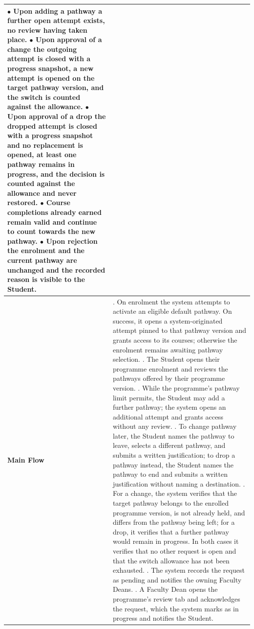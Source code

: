 \begin{longtable}{|>{\raggedright\arraybackslash}p{}|>{\raggedright\arraybackslash}p{}|}
$\bullet$ Upon adding a pathway a further open attempt exists, no review having taken place. \newline
$\bullet$ Upon approval of a change the outgoing attempt is closed with a progress snapshot, a new attempt is opened on the target pathway version, and the switch is counted against the allowance. \newline
$\bullet$ Upon approval of a drop the dropped attempt is closed with a progress snapshot and no replacement is opened, at least one pathway remains in progress, and the decision is counted against the allowance and never restored. \newline
$\bullet$ Course completions already earned remain valid and continue to count towards the new pathway. \newline
$\bullet$ Upon rejection the enrolment and the current pathway are unchanged and the recorded reason is visible to the Student. \\ \hline
\textbf{Main Flow} &
1. On enrolment the system attempts to activate an eligible default pathway. On success, it opens a system-originated attempt pinned to that pathway version and grants access to its courses; otherwise the enrolment remains awaiting pathway selection. \newline
2. The Student opens their programme enrolment and reviews the pathways offered by their programme version. \newline
3. While the programme's pathway limit permits, the Student may add a further pathway; the system opens an additional attempt and grants access without any review. \newline
4. To change pathway later, the Student names the pathway to leave, selects a different pathway, and submits a written justification; to drop a pathway instead, the Student names the pathway to end and submits a written justification without naming a destination. \newline
5. For a change, the system verifies that the target pathway belongs to the enrolled programme version, is not already held, and differs from the pathway being left; for a drop, it verifies that a further pathway would remain in progress. In both cases it verifies that no other request is open and that the switch allowance has not been exhausted. \newline
6. The system records the request as pending and notifies the owning Faculty Deans. \newline
7. A Faculty Dean opens the programme's review tab and acknowledges the request, which the system marks as in progress and notifies the Student. \newline

\end{longtable}
